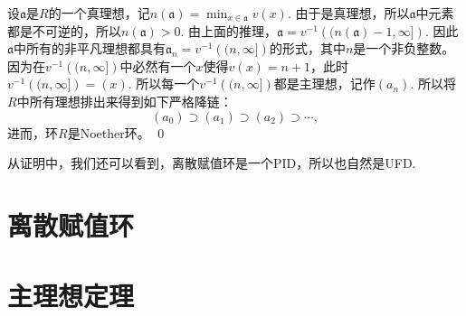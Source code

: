 	设$\mathfrak{a}$是$R$的一个真理想，记$n(\mathfrak{a})=\min_{x\in \mathfrak{a}}v(x)$. 由于是真理想，所以$\mathfrak{a}$中元素都是不可逆的，所以$n(\mathfrak{a})>0$. 由上面的推理，$\mathfrak{a}=v^{-1}\left((n(\mathfrak{a})-1,\infty]\right)$. 因此$\mathfrak{a}$中所有的非平凡理想都具有$\mathfrak{a}_n=v^{-1}\left((n,\infty]\right)$的形式，其中$n$是一个非负整数。因为在$v^{-1}\left((n,\infty]\right)$中必然有一个$x$使得$v(x)=n+1$，此时$v^{-1}\left((n,\infty]\right)=(x)$. 所以每一个$v^{-1}\left((n,\infty]\right)$都是主理想，记作$(a_n)$. 所以将$R$中所有理想排出来得到如下严格降链：
	\[
		(a_0)\supset (a_1) \supset (a_2)\supset \cdots,
	\]
	进而，环$R$是Noether环。
\qed

从证明中，我们还可以看到，离散赋值环是一个PID，所以也自然是UFD.

\section{离散赋值环}
\section{主理想定理}